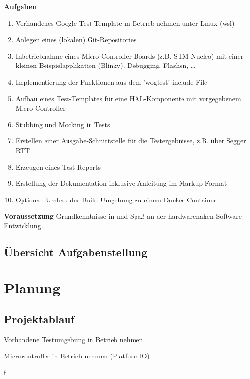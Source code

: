 \documentclass[12pt,a4paper]{article}
\begin{document}
\textbf{Aufgaben}
\begin{enumerate}
  \item Vorhandenes Google-Test-Template in Betrieb nehmen unter Linux (wsl)
  \item Anlegen eines (lokalen) Git-Repositories
  \item Inbetriebnahme eines Micro-Controller-Boards (z.B. STM-Nucleo) mit einer kleinen Beispielapplikation (Blinky). Debugging, Flashen, …
  \item Implementierung der Funktionen aus dem 'wogtest'-include-File
  \item Aufbau eines Test-Templates für eine HAL-Komponente mit vorgegebenem Micro-Controller
  \item Stubbing und Mocking in Tests
  \item Erstellen einer Ausgabe-Schnittstelle für die Testergebnisse, z.B. über Segger RTT
  \item Erzeugen eines Test-Reports
  \item Erstellung der Dokumentation inklusive Anleitung im Markup-Format
  \item Optional: Umbau der Build-Umgebung zu einem Docker-Container\newline
\end{enumerate}
\textbf{Voraussetzung}
\newline
Grundkenntnisse in und Spaß an der hardwarenahen Software-Entwicklung.

\subsection{Übersicht Aufgabenstellung}

\empty

\newpage
\section{Planung}
\subsection{Projektablauf}
\begin{itimize}
  \item Vorhandene Testumgebung in Betrieb nehmen
  \item Microcontroller in Betrieb nehmen (PlatformIO)
  \item f

\end{itimize}


\newpage
\end{document}
